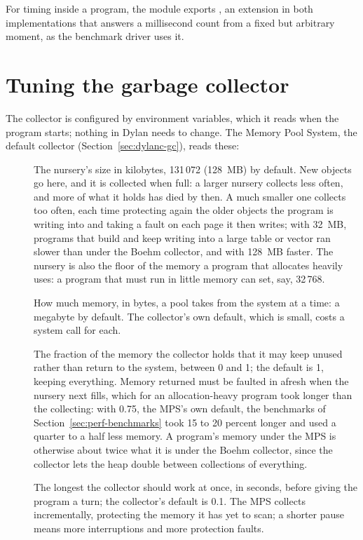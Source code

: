 For timing inside a program, the  module exports
, an extension in both implementations that
answers a millisecond count from a fixed but arbitrary moment, as the
benchmark driver uses it.

\section{Tuning the garbage collector}\label{sec:perf-gc}

The collector is configured by environment variables, which it reads
when the program starts; nothing in Dylan needs to change. The Memory
Pool System, the default collector (Section~\ref{sec:dylanc-gc}), reads
these:

\begin{description}
\item[] The nursery's size in kilobytes,
  131\,072 (128~MB) by default. New objects go here, and it is collected
  when full: a larger nursery collects less often, and more of what it
  holds has died by then. A much smaller one collects too often, each
  time protecting again the older objects the program is writing into
  and taking a fault on each page it then writes; with 32~MB, programs
  that build and keep writing into a large table or vector ran slower
  than under the Boehm collector, and with 128~MB faster. The nursery is
  also the floor of the memory a program that allocates heavily uses: a
  program that must run in little memory can set, say, 32\,768.
\item[] How much memory, in bytes, a pool
  takes from the system at a time: a megabyte by default. The
  collector's own default, which is small, costs a system call for each.
\item[] The fraction of the memory the
  collector holds that it may keep unused rather than return to the
  system, between 0 and 1; the default is 1, keeping everything. Memory
  returned must be faulted in afresh when the nursery next fills, which
  for an allocation-heavy program took longer than the collecting: with
  0.75, the MPS's own default, the benchmarks of
  Section~\ref{sec:perf-benchmarks} took 15 to 20 percent longer and used
  a quarter to a half less memory. A program's memory under the MPS is otherwise
  about twice what it is under the Boehm collector, since the collector
  lets the heap double between collections of everything.
\item[] The longest the collector should
  work at once, in seconds, before giving the program a turn; the
  collector's default is 0.1. The MPS collects incrementally, protecting
  the memory it has yet to scan; a shorter pause means more interruptions
  and more protection faults.
\end{description}

